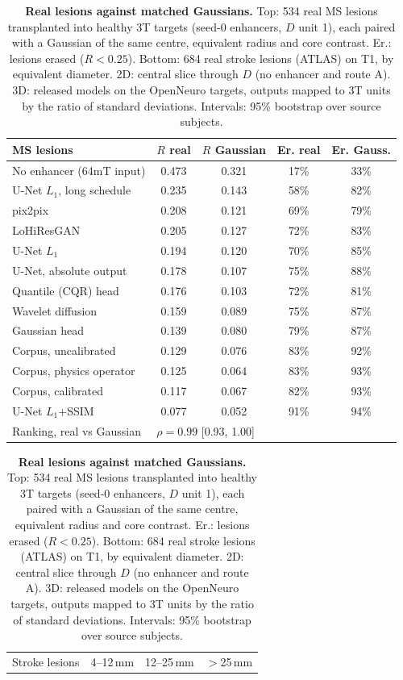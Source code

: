 \begin{table}[!htbp]
{\caption{\textbf{Real lesions against matched Gaussians.} Top: 534 real MS lesions transplanted into healthy 3T targets (seed-0 enhancers, $D$ unit 1), each paired with a Gaussian of the same centre, equivalent radius and core contrast. Er.: lesions erased ($R<0.25$). Bottom: 684 real stroke lesions (ATLAS) on T1, by equivalent diameter. 2D: central slice through $D$ (no enhancer and route A). 3D: released models on the OpenNeuro targets, outputs mapped to 3T units by the ratio of standard deviations. Intervals: 95\% bootstrap over source subjects.}}
{\scriptsize\setlength{\tabcolsep}{2.5pt}\begin{tabular*}{\linewidth}{@{\extracolsep{\fill}}lcccc@{}}
\toprule
MS lesions & $R$ real & $R$ Gaussian & Er. real & Er. Gauss. \\
\midrule
No enhancer (64mT input) & 0.473 & 0.321 & 17\% & 33\% \\
U-Net $L_1$, long schedule & 0.235 & 0.143 & 58\% & 82\% \\
pix2pix & 0.208 & 0.121 & 69\% & 79\% \\
LoHiResGAN & 0.205 & 0.127 & 72\% & 83\% \\
U-Net $L_1$ & 0.194 & 0.120 & 70\% & 85\% \\
U-Net, absolute output & 0.178 & 0.107 & 75\% & 88\% \\
Quantile (CQR) head & 0.176 & 0.103 & 72\% & 81\% \\
Wavelet diffusion & 0.159 & 0.089 & 75\% & 87\% \\
Gaussian head & 0.139 & 0.080 & 79\% & 87\% \\
Corpus, uncalibrated & 0.129 & 0.076 & 83\% & 92\% \\
Corpus, physics operator & 0.125 & 0.064 & 83\% & 93\% \\
Corpus, calibrated & 0.117 & 0.067 & 82\% & 93\% \\
U-Net $L_1$+SSIM & 0.077 & 0.052 & 91\% & 94\% \\
\midrule
Ranking, real vs Gaussian & \multicolumn{4}{l}{$\rho = 0.99$ [0.93, 1.00]} \\
\bottomrule
\end{tabular*}
\par\vspace{2ex}
\begin{tabular*}{\linewidth}{@{\extracolsep{\fill}}lccc@{}}
\toprule
Stroke lesions & 4--12\,mm & 12--25\,mm & $>$25\,mm \\

\end{tabular*}}
\end{table}
